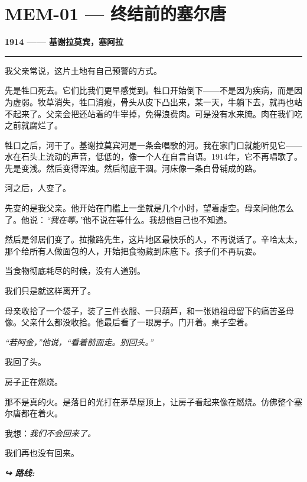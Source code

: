 \section*{\textbf{MEM-01} --- 终结前的塞尔唐}


\noindent \textbf{1914 —— 基谢拉莫宾，塞阿拉}

\vspace{0.5em}\noindent\rule{\textwidth}{0.5pt}\vspace{0.5em}

\noindent 我父亲常说，这片土地有自己预警的方式。

\noindent 先是牲口死去。它们比我们更早感觉到。牲口开始倒下——不是因为疾病，而是因为虚弱。牧草消失，牲口消瘦，骨头从皮下凸出来，某一天，牛躺下去，就再也站不起来了。父亲会把还站着的牛宰掉，免得浪费肉。可是没有水来腌。肉在我们吃之前就腐烂了。

\noindent 牲口之后，河干了。基谢拉莫宾河是一条会唱歌的河。我在家门口就能听见它——水在石头上流动的声音，低低的，像一个人在自言自语。1914年，它不再唱歌了。先是变浅。然后变得浑浊。然后彻底干涸。河床像一条白骨铺成的路。

\noindent 河之后，人变了。

\noindent 先变的是我父亲。他开始在门槛上一坐就是几个小时，望着虚空。母亲问他怎么了。他说：\textit{“我在等。”}他不说在等什么。我想他自己也不知道。

\noindent 然后是邻居们变了。拉撒路先生，这片地区最快乐的人，不再说话了。辛哈太太，那个给所有人做面包的人，开始把食物藏到床底下。孩子们不再玩耍。

\noindent 当食物彻底耗尽的时候，没有人道别。

\noindent 我们只是就这样离开了。

\noindent 母亲收拾了一个袋子，装了三件衣服、一只葫芦，和一张她祖母留下的痛苦圣母像。父亲什么都没收拾。他最后看了一眼房子。门开着。桌子空着。

\noindent \textit{“若阿金，”他说，“看着前面走。别回头。”}

\noindent 我回了头。

\noindent 房子正在燃烧。

\noindent 那不是真的火。是落日的光打在茅草屋顶上，让房子看起来像在燃烧。仿佛整个塞尔唐都在着火。

\noindent 我想：\textit{我们不会回来了。}

\noindent 我们再也没有回来。

\vspace{0.5em}
\noindent\textit{\textbf{↪ 路线:}  \rotasep {}}
